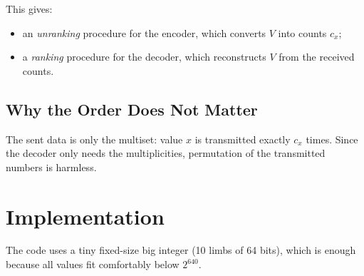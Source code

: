 \documentclass[11pt,a4paper]{article}
\begin{document}
This gives:
\begin{itemize}
  \item an \emph{unranking} procedure for the encoder, which converts $V$ into counts $c_x$;
  \item a \emph{ranking} procedure for the decoder, which reconstructs $V$ from the received counts.
\end{itemize}

\subsection{Why the Order Does Not Matter}
The sent data is only the multiset: value $x$ is transmitted exactly $c_x$ times. Since the decoder only needs the multiplicities, permutation of the transmitted numbers is harmless.

\section{Implementation}

The code uses a tiny fixed-size big integer (10 limbs of 64 bits), which is enough because all values fit comfortably below $2^{640}$.
\end{document}

